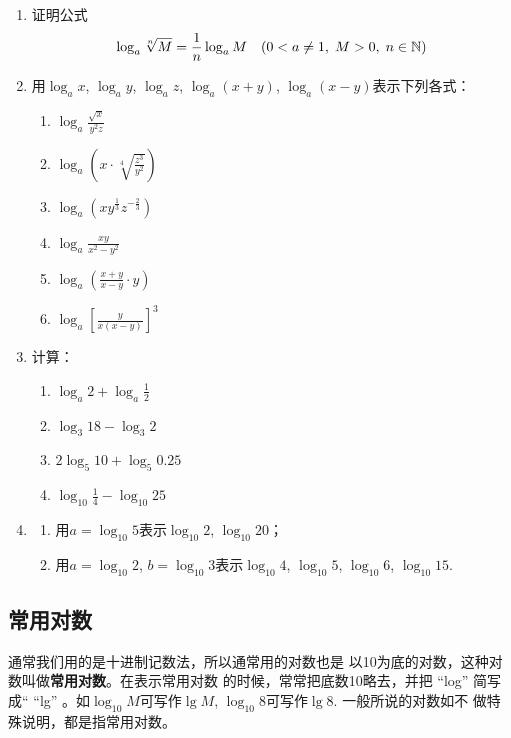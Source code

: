 \begin{ex}
\begin{enumerate}
    \item 证明公式
\[\log_a \sqrt[n]{M}=\dfrac{1}{n}\log_a M\quad (0<a\ne 1,\; M>0,\; n\in \mathbb{N})\]
\item 用$\log_a x$, $\log_a y$, $\log_a z$, $\log_a (x+y)$, $\log_a (x-y)$表示下列各式：
\begin{multicols}{2}
\begin{enumerate}[(1)]
    \item $\log_a \frac{\sqrt{x}}{y^2 z}$
    \item $\log_a \left(x\cdot \sqrt[4]{\frac{z^3}{y^2}}\right)$
    \item $\log_a \left(xy^{\tfrac{1}{3}}z^{-\tfrac{2}{3}}\right)$
    \item $\log_a \frac{xy}{x^2-y^2}$
    \item $\log_a \left(\frac{x+y}{x-y}\cdot y\right)$
    \item $\log_a \left[\frac{y}{x(x-y)}\right]^3$
\end{enumerate}
\end{multicols}

\item 计算：    
\begin{multicols}{2}
\begin{enumerate}[(1)]
    \item $\log_a 2+\log_a \frac{1}{2}$
    \item $\log_3 18-\log_3 2$
    \item $2\log_5 10+\log_5 0.25$
    \item $\log_{10}\frac{1}{4}-\log_{10}25 $
\end{enumerate}
\end{multicols}
 
\item \begin{enumerate}[(1)]
    \item 用$a=\log_{10}5$表示$\log_{10}2$, $\log_{10}20$；
    \item 用$a=\log_{10}2$, $b=\log_{10}3$表示$\log_{10}4$, $\log_{10}5$, $\log_{10}6$, $\log_{10}15$.
\end{enumerate}
\end{enumerate}
\end{ex}
 
\subsection{常用对数}
通常我们用的是十进制记数法，所以通常用的对数也是
以10为底的对数，这种对数叫做\textbf{常用对数}。在表示常用对数
的时候，常常把底数10略去，并把
“log”
简写成“
“lg”
。如$\log_{10}M$可写作$\lg M$, $\log_{10}8$可写作$\lg8$. 一般所说的对数如不
做特殊说明，都是指常用对数。


